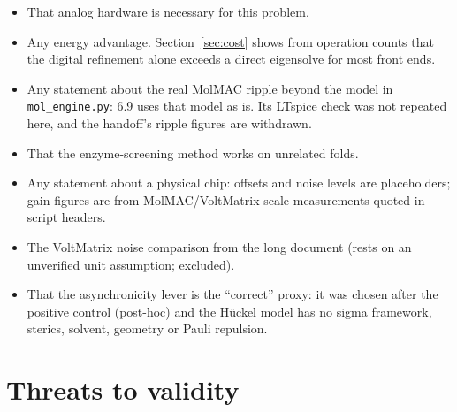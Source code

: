 \documentclass[11pt]{article}
\newcommand{\scr}[1]{\texttt{#1}}
\begin{document}
\begin{itemize}
  \item That analog hardware is necessary for this problem.
  \item Any energy advantage. Section~\ref{sec:cost} shows from operation counts that the digital refinement alone exceeds a direct eigensolve for most front ends.
  \item Any statement about the real MolMAC ripple beyond the model in \scr{mol\_engine.py}: 6.9 uses that model as is. Its LTspice check was not repeated here, and the handoff's ripple figures are withdrawn.
  \item That the enzyme-screening method works on unrelated folds.
  \item Any statement about a physical chip: offsets and noise levels are placeholders; gain figures are from MolMAC/VoltMatrix-scale measurements quoted in script headers.
  \item The VoltMatrix noise comparison from the long document (rests on an unverified unit assumption; excluded).
  \item That the asynchronicity lever is the ``correct'' proxy: it was chosen after the positive control (post-hoc) and the H\"uckel model has no sigma framework, sterics, solvent, geometry or Pauli repulsion.
\end{itemize}

\section{Threats to validity}
\end{document}
